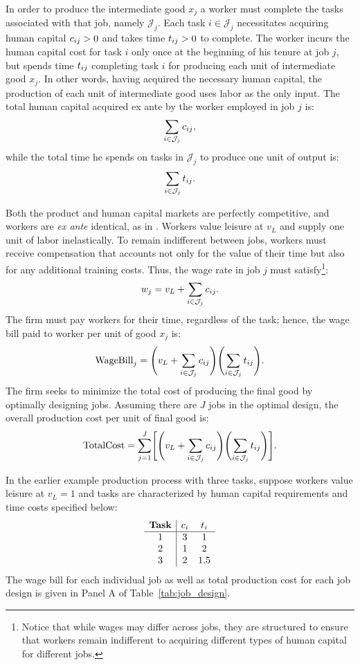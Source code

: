 \documentclass{article}
\theoremstyle{plain}
\theoremstyle{plain}
\begin{document}
In order to produce the intermediate good $x_j$ a worker must complete the tasks associated with that job, namely $\mathcal{J}_j$.
Each task $i \in \mathcal{J}_j$ necessitates acquiring human capital $c_{ij} > 0$ and takes time $t_{ij} > 0$ to complete.
The worker incurs the human capital cost for task $i$ only once at the beginning of his tenure at job $j$, but spends time $t_{ij}$ completing task $i$ for producing each unit of intermediate good $x_j$. 
In other words, having acquired the necessary human capital, the production of each unit of intermediate good uses labor as the only input.
The total human capital acquired ex ante by the worker employed in job $j$ is:
\[
\sum_{i \in \mathcal{J}_j} c_{ij},
\]
while the total time he spends on tasks in $\mathcal{J}_j$ to produce one unit of output is:
\[
\sum_{i \in \mathcal{J}_j} t_{ij}.
\]

Both the product and human capital markets are perfectly competitive, and workers are \emph{ex ante} identical, as in \cite{becker1992division}.
Workers value leisure at $v_L$ and supply one unit of labor inelastically.
To remain indifferent between jobs, workers must receive compensation that accounts not only for the value of their time but also for any additional training costs.
Thus, the wage rate in job $j$ must satisfy\footnote{Notice that while wages may differ across jobs, they are structured to ensure that workers remain indifferent to acquiring different types of human capital for different jobs.}:
\[
w_j = v_L + \sum_{i \in \mathcal{J}_j} c_{ij}.
\]
The firm must pay workers for their time, regardless of the task; hence, the wage bill paid to worker per unit of good $x_j$ is:
\[
\text{WageBill}_j = \Biggl(v_L + \sum_{i \in \mathcal{J}_j} c_{ij} \Biggr) \Biggl(\sum_{i \in \mathcal{J}_j} t_{ij} \Biggr).
\]
The firm seeks to minimize the total cost of producing the final good by optimally designing jobs.
Assuming there are $J$ jobs in the optimal design, the overall production cost per unit of final good is:
\[
\text{TotalCost} = \sum_{j=1}^J \Biggl[\Biggl(v_L + \sum_{i \in \mathcal{J}_j} c_{ij} \Biggr) \Biggl(\sum_{i \in \mathcal{J}_j} t_{ij} \Biggr)\Biggr].
\]

In the earlier example production process with three tasks, suppose workers value leisure at $v_L = 1$ and tasks are characterized by human capital requirements and time costs specified below:
\[
\begin{array}{c|ccc}
\textbf{Task} & c_{i} & t_{i} \\ \hline
1 & 3  & 1 \\
2 & 1 & 2  \\
3 & 2   & 1.5 \\
\end{array}
\]
The wage bill for each individual job as well as total production cost for each job design is given in Panel A of Table~\ref{tab:job_design}.
\end{document}
